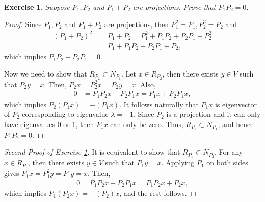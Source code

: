 \documentclass[10pt]{book}
\newtheorem{exercise}{Exercise}[section]
\theoremstyle{definition}
\numberwithin{equation}{chapter}
\begin{document}
\medskip

\begin{exercise}\label{exercise_16310}
Suppose $P_1, P_2$ and $P_1 + P_2$ are projections. Prove that $P_1 P_2 = 0$.
\end{exercise}
\begin{proof}
Since $P_1, P_2$ and $P_1 + P_2$ are projections, then $P_1^2 = P_1, P_2^2 = P_2$ and 
\begin{align*}
    \left(P_1 + P_2\right)^2 & = P_1 + P_2 = P_1^2 + P_1 P_2 + P_2 P_1 + P_2^2 \\
    & = P_1 + P_1 P_2 + P_2 P_1 + P_2,
\end{align*}
which implies $P_1 P_2 + P_2 P_1 = 0$. 

Now we need to show that $R_{P_2} \subset N_{P_1}$. Let $x \in R_{P_2}$, then there exists $y \in V$ such that $P_2 y = x$. Then, $P_2 x = P_2^2 x = P_2 y = x$. Also,
\begin{align*}
    0 & = P_1 P_2 x + P_2 P_1 x = P_1 x + P_2 P_1 x,
\end{align*}
which implies $P_2(P_1x) = - (P_1x)$. It follows naturally that $P_1 x$ is eigenvector of $P_2$ corresponding to eigenvalue $\lambda  = -1$. Since $P_2$ is a projection and it can only have eigenvalues $0$ or $1$, then $P_1 x$ can only be zero. Thus, $R_{P_2} \subset N_{P_1}$, and hence $P_1 P_2 = 0$.
\end{proof}

\medskip

\begin{proof}[Second Proof of Exercise \ref{exercise_16310}]
It is equivalent to show that $R_{P_1} \subset N_{P_2}$. For any $x \in R_{P_1}$, then there exists $y \in V$ such that $P_1y = x$. Applying $P_1$ on both sides gives $P_1x = P_1^2y = P_1y = x$. Then,
\begin{align*}
    0 = P_1P_2x + P_2P_1x = P_1P_2x + P_2x,
\end{align*}
which implies $P_1(P_2x) = - (P_2)x$, and the rest follows.
\end{proof}

\medskip
\end{document}
